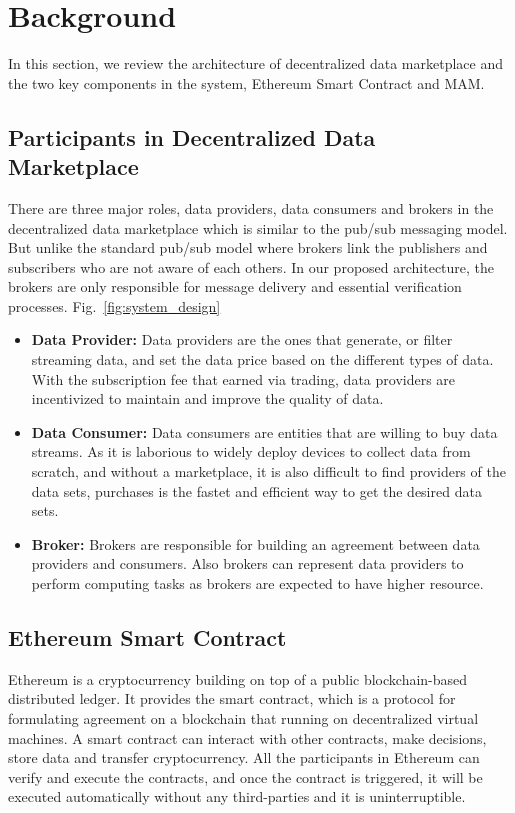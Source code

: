 \documentclass[conference]{IEEEtran}
\begin{document}
\section{Background}
In this section, we review the architecture of decentralized data marketplace and the two key components in the system, Ethereum Smart Contract and MAM.

\subsection{Participants in Decentralized Data Marketplace}
There are three major roles, data providers, data consumers and brokers in the decentralized data marketplace which is similar to the pub/sub messaging model. But unlike the standard pub/sub model where brokers link the publishers and subscribers who are not aware of each others. In our proposed architecture, the brokers are only responsible for message delivery and essential verification processes. Fig.~\ref{fig:system_design}

\begin{itemize}
\item \textbf{Data Provider: }
Data providers are the ones that generate, or filter streaming data, and set the data price based on the different types of data. With the subscription fee that earned via trading, data providers are incentivized to maintain and improve the quality of data.
\item \textbf{Data Consumer: }
Data consumers are entities that are willing to buy data streams. As it is laborious to widely deploy devices to collect data from scratch, and without a marketplace, it is also difficult to find providers of the data sets, purchases is the fastet and efficient way to get the desired data sets. 
\item \textbf{Broker: }
Brokers are responsible for building an agreement between data providers and consumers. Also brokers can represent data providers to perform computing tasks as brokers are expected to have higher resource. 
\end{itemize}

\subsection{Ethereum Smart Contract}
Ethereum is a cryptocurrency building on top of a public blockchain-based distributed ledger. 
It provides the smart contract, which is a protocol for formulating agreement on a blockchain that running on decentralized virtual machines. A smart contract can interact with other contracts, make decisions, store data and transfer cryptocurrency. All the participants in Ethereum can verify and execute the contracts, and once the contract is triggered, it will be executed automatically without any third-parties and it is uninterruptible. 
\end{document}
